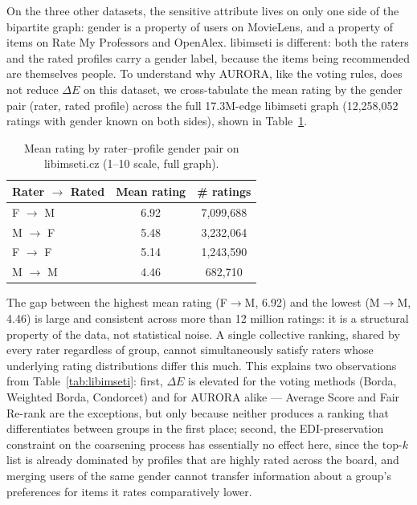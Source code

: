 \documentclass[runningheads]{llncs}
\begin{document}
On the three other datasets, the sensitive attribute lives on only one side
of the bipartite graph: gender is a property of users on MovieLens, and a
property of items on Rate My Professors and OpenAlex. libimseti is
different: both the raters and the rated profiles carry a gender label,
because the items being recommended are themselves people. To understand
why AURORA, like the voting rules, does not reduce $\Delta E$ on this
dataset, we cross-tabulate the mean rating by the gender pair (rater,
rated profile) across the full 17.3M-edge libimseti graph (12{,}258{,}052
ratings with gender known on both sides), shown in
Table~\ref{tab:libimseti-crosstab}.

\begin{table}[h!]
\caption{Mean rating by rater--profile gender pair on libimseti.cz
(1--10 scale, full graph).}
\label{tab:libimseti-crosstab}
\centering
\begin{tabular}{lcc}
\hline
Rater $\to$ Rated & Mean rating & \# ratings \\
\hline
F $\to$ M & 6.92 & 7{,}099{,}688 \\
M $\to$ F & 5.48 & 3{,}232{,}064 \\
F $\to$ F & 5.14 & 1{,}243{,}590 \\
M $\to$ M & 4.46 &   682{,}710 \\
\hline
\end{tabular}
\end{table}

The gap between the highest mean rating (F$\to$M, 6.92) and the lowest
(M$\to$M, 4.46) is large and consistent across more than 12 million
ratings: it is a structural property of the data, not statistical noise.
A single collective ranking, shared by every rater regardless of group,
cannot simultaneously satisfy raters whose underlying rating distributions
differ this much. This explains two observations from
Table~\ref{tab:libimseti}: first, $\Delta E$ is elevated for the voting
methods (Borda, Weighted Borda, Condorcet) and for AURORA alike --- Average
Score and Fair Re-rank are the exceptions, but only because neither
produces a ranking that differentiates between groups in the first place;
second, the EDI-preservation constraint on the coarsening process has
essentially no effect here, since the top-$k$ list is already dominated by
profiles that are highly rated across the board, and merging users of the
same gender cannot transfer information about a group's preferences for
items it rates comparatively lower.
\end{document}

